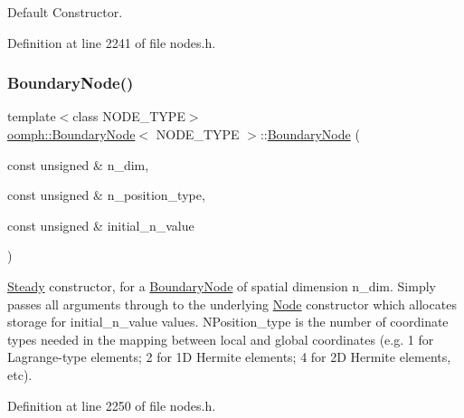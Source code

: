 Default Constructor. 



Definition at line 2241 of file nodes.\+h.

\mbox{\label{classoomph_1_1BoundaryNode_a3d76a60cda13edec1549693fc6e49214}} 
\subsubsection{\texorpdfstring{Boundary\+Node()}{BoundaryNode()}\hspace{0.1cm}{\footnotesize\ttfamily [2/6]}}
{\footnotesize\ttfamily template$<$class N\+O\+D\+E\+\_\+\+T\+Y\+PE$>$ \\
\hyperlink{classoomph_1_1BoundaryNode}{oomph\+::\+Boundary\+Node}$<$ N\+O\+D\+E\+\_\+\+T\+Y\+PE $>$\+::\hyperlink{classoomph_1_1BoundaryNode}{Boundary\+Node} (\begin{DoxyParamCaption}\item[{const unsigned \&}]{n\+\_\+dim,  }\item[{const unsigned \&}]{n\+\_\+position\+\_\+type,  }\item[{const unsigned \&}]{initial\+\_\+n\+\_\+value }\end{DoxyParamCaption})\hspace{0.3cm}{\ttfamily [inline]}}



\hyperlink{classoomph_1_1Steady}{Steady} constructor, for a \hyperlink{classoomph_1_1BoundaryNode}{Boundary\+Node} of spatial dimension n\+\_\+dim. Simply passes all arguments through to the underlying \hyperlink{classoomph_1_1Node}{Node} constructor which allocates storage for initial\+\_\+n\+\_\+value values. N\+Position\+\_\+type is the number of coordinate types needed in the mapping between local and global coordinates (e.\+g. 1 for Lagrange-\/type elements; 2 for 1D Hermite elements; 4 for 2D Hermite elements, etc). 



Definition at line 2250 of file nodes.\+h.

\mbox{\label{classoomph_1_1BoundaryNode_a1a18c0a20d10ae670671de9600846edb}} 
